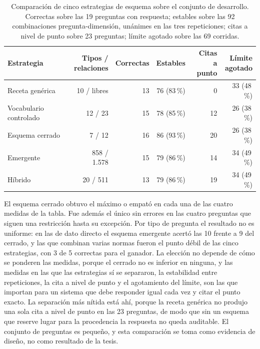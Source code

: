 \documentclass[12pt,a4paper]{report}
\begin{document}
\begin{table}[H]
  \centering
  \small
  \setlength{\tabcolsep}{5pt}
  \begin{tabular}{@{}lrrrrr@{}}
    \toprule
    Estrategia & \shortstack[r]{Tipos /\\relaciones} & Correctas & Estables
      & \shortstack[r]{Citas\\a punto} & \shortstack[r]{Límite\\agotado} \\
    \midrule
    Receta genérica         & 10 / libres  & 13 & 76 (83\,\%) &  0 & 33 (48\,\%) \\
    Vocabulario controlado  & 12 / 23      & 15 & 78 (85\,\%) & 12 & 26 (38\,\%) \\
    Esquema cerrado         & 7 / 12       & 16 & 86 (93\,\%) & 20 & 26 (38\,\%) \\
    Emergente               & 858 / 1.578  & 15 & 79 (86\,\%) & 14 & 34 (49\,\%) \\
    Híbrido                 & 20 / 511     & 13 & 79 (86\,\%) & 19 & 34 (49\,\%) \\
    \bottomrule
  \end{tabular}
  \caption[Comparación de cinco estrategias de esquema]{Comparación de
    cinco estrategias de esquema sobre el conjunto de desarrollo.
    Correctas sobre las 19 preguntas con respuesta; estables sobre las 92
    combinaciones pregunta-dimensión, unánimes en las tres repeticiones;
    citas a nivel de punto sobre 23 preguntas; límite agotado sobre las
    69 corridas.}
  \label{tab:cinco_estrategias}
\end{table}

El esquema cerrado obtuvo el máximo o empató en cada una de las cuatro medidas de la tabla. Fue además el único sin errores en las cuatro preguntas que siguen una restricción hasta su excepción. Por tipo de pregunta el resultado no es uniforme: en las de dato directo el esquema emergente acertó las 10 frente a 9 del cerrado, y las que combinan varias normas fueron el punto débil de las cinco estrategias, con 3 de 5 correctas para el ganador. La elección no depende de cómo se ponderen las medidas, porque el cerrado no es inferior en ninguna, y las medidas en las que las estrategias sí se separaron, la estabilidad entre repeticiones, la cita a nivel de punto y el agotamiento del límite, son las que importan para un sistema que debe responder igual cada vez y citar el punto exacto. La separación más nítida está ahí, porque la receta genérica no produjo una sola cita a nivel de punto en las 23 preguntas, de modo que sin un esquema que reserve lugar para la procedencia la respuesta no queda auditable. El conjunto de preguntas es pequeño, y esta comparación se toma como evidencia de diseño, no como resultado de la tesis.
\end{document}
